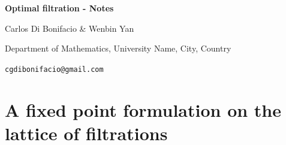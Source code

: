 \documentclass[11pt]{article}
\numberwithin{equation}{section}
\theoremstyle{plain}
\theoremstyle{definition}
\theoremstyle{remark}
\begin{document}
\begin{center}
{\Large\bfseries Optimal filtration - Notes \par}

\vspace{1.1cm}

{\normalsize Carlos Di Bonifacio \&  Wenbin Yan}

\vspace{0.2cm}

{\small Department of Mathematics, University Name, City, Country\par}
{\small \texttt{cgdibonifacio@gmail.com}\par}
\end{center}
\section{A fixed point formulation on the lattice of filtrations}
\end{document}
